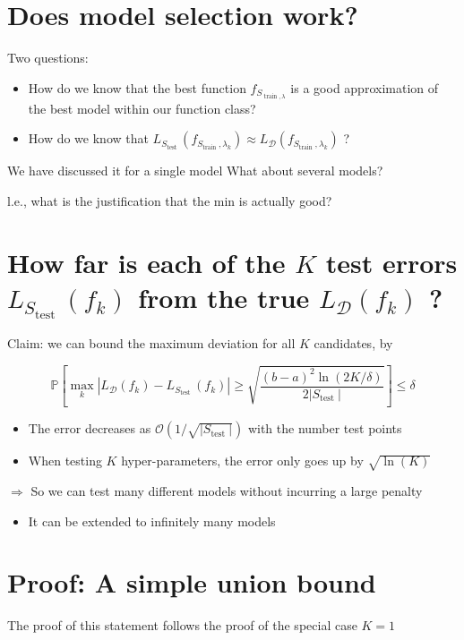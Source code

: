 \documentclass[10pt]{article}
\begin{document}
\section*{Does model selection work?}
Two questions:

\begin{itemize}
  \item How do we know that the best function $f_{S_{\operatorname{train}, \lambda}}$ is a good approximation of the best model within our function class?

  \item How do we know that $L_{S_{\text {test }}}\left(f_{S_{\text {train }}, \lambda_{k}}\right) \approx L_{\mathscr{D}}\left(f_{S_{\text {train }}, \lambda_{k}}\right)$ ?

\end{itemize}

We have discussed it for a single model What about several models?

l.e., what is the justification that the min is actually good?

\section*{How far is each of the $K$ test errors $L_{S_{\text {test }}}\left(f_{k}\right)$ from the true $L_{\mathscr{D}}\left(f_{k}\right)$ ?}
Claim: we can bound the maximum deviation for all $K$ candidates, by

$$
\mathbb{P}\left[\max _{k}\left|L_{\mathscr{D}}\left(f_{k}\right)-L_{S_{\text {test }}}\left(f_{k}\right)\right| \geq \sqrt{\frac{(b-a)^{2} \ln (2 K / \delta)}{2\left|S_{\text {test }}\right|}}\right] \leq \delta
$$

\begin{itemize}
  \item The error decreases as $\mathcal{O}\left(1 / \sqrt{\left|S_{\text {test }}\right|}\right)$ with the number test points
  \item When testing $K$ hyper-parameters, the error only goes up by $\sqrt{\ln (K)}$
\end{itemize}

$\Rightarrow$ So we can test many different models without incurring a large penalty

\begin{itemize}
  \item It can be extended to infinitely many models
\end{itemize}

\section*{Proof: A simple union bound}
The proof of this statement follows the proof of the special case $K=1$
\end{document}
